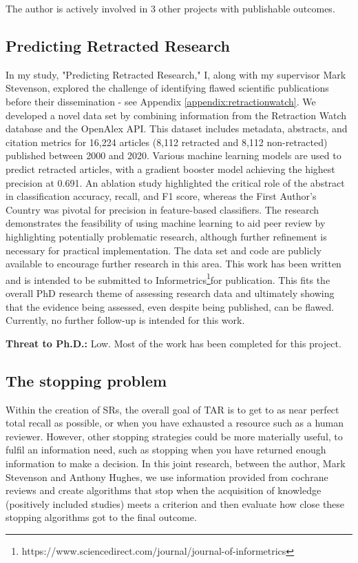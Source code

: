 \documentclass[../main.tex]{subfiles}
\begin{document}
The author is actively involved in 3 other projects with publishable outcomes.

\subsection{Predicting Retracted Research}

In my study, "Predicting Retracted Research," I, along with my supervisor Mark Stevenson, explored the challenge of identifying flawed scientific publications before their dissemination - see Appendix \ref{appendix:retractionwatch}. We developed a novel data set by combining information from the Retraction Watch database and the OpenAlex API. This dataset includes metadata, abstracts, and citation metrics for 16,224 articles (8,112 retracted and 8,112 non-retracted) published between 2000 and 2020. Various machine learning models are used to predict retracted articles, with a gradient booster model achieving the highest precision at 0.691. An ablation study highlighted the critical role of the abstract in classification accuracy, recall, and F1 score, whereas the First Author's Country was pivotal for precision in feature-based classifiers. The research demonstrates the feasibility of using machine learning to aid peer review by highlighting potentially problematic research, although further refinement is necessary for practical implementation. The data set and code are publicly available to encourage further research in this area. This work has been written and is intended to be submitted to Informetrics\footnote{https://www.sciencedirect.com/journal/journal-of-informetrics}for publication. This fits the overall PhD research theme of assessing research data and ultimately showing that the evidence being assessed, even despite being published, can be flawed. Currently, no further follow-up is intended for this work.

\textbf{Threat to Ph.D.:} Low. Most of the work has been completed for this project.

\subsection{The stopping problem}

Within the creation of SRs, the overall goal of TAR is to get to as near perfect total recall as possible, or when you have exhausted a resource such as a human reviewer. However, other stopping strategies could be more materially useful, to fulfil an information need, such as stopping when you have returned enough information to make a decision. In this joint research, between the author, Mark Stevenson and Anthony Hughes, we use information provided from cochrane reviews and create algorithms that stop when the acquisition of knowledge (positively included studies) meets a criterion and then evaluate how close these stopping algorithms got to the final outcome.
\end{document}
